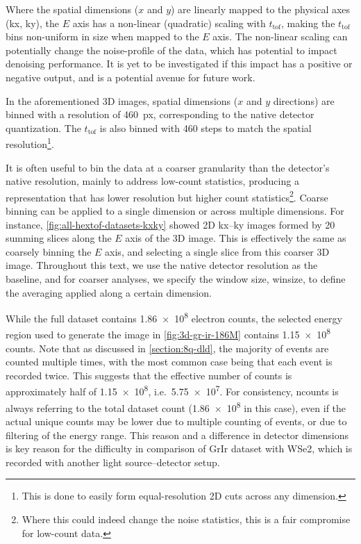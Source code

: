 Where the spatial dimensions ($x$ and $y$) are linearly mapped to the physical axes (\gls{kx}, \gls{ky}), the $E$ axis has a non-linear (quadratic) scaling with $t_{\text{tof}}$, making the $t_{\text{tof}}$ bins non-uniform in size when mapped to the $E$ axis. The non-linear scaling can potentially change the noise-profile of the data, which has potential to impact denoising performance. It is yet to be investigated if this impact has a positive or negative output, and is a potential avenue for future work.

In the aforementioned 3D images, spatial dimensions ($x$ and $y$ directions) are binned with a resolution of \qty{460}{px}, corresponding to the native detector quantization. The $t_{\text{tof}}$ is also binned with \num{460} steps to match the spatial resolution\footnote{This is done to easily form equal-resolution 2D cuts across any dimension.}. 

It is often useful to bin the data at a coarser granularity than the detector's native resolution, mainly to address low-count statistics, producing a representation that has lower resolution but higher count statistics\footnote{Where this could indeed change the noise statistics, this is a fair compromise for low-count data.}. Coarse binning can be applied to a single dimension or across multiple dimensions. For instance, \cref{fig:all-hextof-datasets-kxky} showed 2D \gls{kx}--\gls{ky} images formed by \num{20} summing slices along the $E$ axis of the 3D image. This is effectively the same as coarsely binning the $E$ axis, and selecting a single slice from this coarser 3D image. Throughout this text, we use the native detector resolution as the baseline, and for coarser analyses, we specify the window size, \gls{winsize}, to define the averaging applied along a certain dimension. 

While the full dataset contains \num{1.86e8} electron counts, the selected energy region used to generate the image in \cref{fig:3d-gr-ir-186M} contains \num{1.15e8} counts. Note that as discussed in \cref{section:8q-dld}, the majority of events are counted multiple times, with the most common case being that each event is recorded twice. This suggests that the effective number of counts is approximately half of \num{1.15e8}, i.e.\ \num{5.75e7}. For consistency, \gls{ncounts} is always referring to the total dataset count (\num{1.86e8} in this case), even if the actual unique counts may be lower due to multiple counting of events, or due to filtering of the energy range. This reason and a difference in detector dimensions is key reason for the difficulty in comparison of \gls{GrIr} dataset with \gls{WSe2}, which is recorded with another light source--detector setup.

